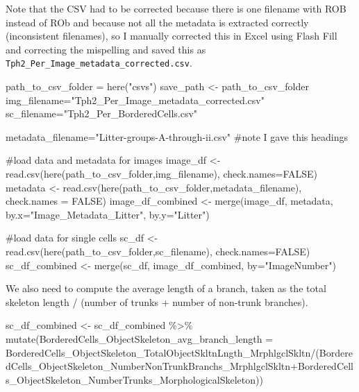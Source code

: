 \documentclass[
  12pt,
  letterpaper,
  DIV=11,
  numbers=noendperiod]{scrartcl}
\newenvironment{Shaded}{\begin{snugshade}}{\end{snugshade}}
\newcommand{\AttributeTok}[1]{\textcolor[rgb]{0.40,0.45,0.13}{#1}}
\newcommand{\CommentTok}[1]{\textcolor[rgb]{0.37,0.37,0.37}{#1}}
\newcommand{\ConstantTok}[1]{\textcolor[rgb]{0.56,0.35,0.01}{#1}}
\newcommand{\FunctionTok}[1]{\textcolor[rgb]{0.28,0.35,0.67}{#1}}
\newcommand{\NormalTok}[1]{\textcolor[rgb]{0.00,0.23,0.31}{#1}}
\newcommand{\OtherTok}[1]{\textcolor[rgb]{0.00,0.23,0.31}{#1}}
\newcommand{\SpecialCharTok}[1]{\textcolor[rgb]{0.37,0.37,0.37}{#1}}
\newcommand{\StringTok}[1]{\textcolor[rgb]{0.13,0.47,0.30}{#1}}
\begin{document}
Note that the CSV had to be corrected because there is one filename with
ROB instead of ROb and because not all the metadata is extracted
correctly (inconsistent filenames), so I manually corrected this in
Excel using Flash Fill and correcting the mispelling and saved this as
\texttt{Tph2\_Per\_Image\_metadata\_corrected.csv}.

\begin{Shaded}
\begin{Highlighting}[]
\NormalTok{path\_to\_csv\_folder }\OtherTok{=} \FunctionTok{here}\NormalTok{(}\StringTok{"csvs"}\NormalTok{)}
\NormalTok{save\_path }\OtherTok{\textless{}{-}}\NormalTok{ path\_to\_csv\_folder}
\NormalTok{img\_filename}\OtherTok{=}\StringTok{"Tph2\_Per\_Image\_metadata\_corrected.csv"}
\NormalTok{sc\_filename}\OtherTok{=}\StringTok{"Tph2\_Per\_BorderedCells.csv"}

\NormalTok{metadata\_filename}\OtherTok{=}\StringTok{"Litter{-}groups{-}A{-}through{-}ii.csv"} \CommentTok{\#note I gave this headings}

\CommentTok{\#load data and metadata for images}
\NormalTok{image\_df }\OtherTok{\textless{}{-}} \FunctionTok{read.csv}\NormalTok{(}\FunctionTok{here}\NormalTok{(path\_to\_csv\_folder,img\_filename), }\AttributeTok{check.names=}\ConstantTok{FALSE}\NormalTok{)}
\NormalTok{metadata }\OtherTok{\textless{}{-}} \FunctionTok{read.csv}\NormalTok{(}\FunctionTok{here}\NormalTok{(path\_to\_csv\_folder,metadata\_filename), }\AttributeTok{check.names =} \ConstantTok{FALSE}\NormalTok{)}
\NormalTok{image\_df\_combined }\OtherTok{\textless{}{-}} \FunctionTok{merge}\NormalTok{(image\_df, metadata, }\AttributeTok{by.x=}\StringTok{"Image\_Metadata\_Litter"}\NormalTok{, }\AttributeTok{by.y=}\StringTok{"Litter"}\NormalTok{)}

\CommentTok{\#load data for single cells}
\NormalTok{sc\_df }\OtherTok{\textless{}{-}} \FunctionTok{read.csv}\NormalTok{(}\FunctionTok{here}\NormalTok{(path\_to\_csv\_folder,sc\_filename), }\AttributeTok{check.names=}\ConstantTok{FALSE}\NormalTok{)}
\NormalTok{sc\_df\_combined }\OtherTok{\textless{}{-}} \FunctionTok{merge}\NormalTok{(sc\_df, image\_df\_combined, }\AttributeTok{by=}\StringTok{"ImageNumber"}\NormalTok{)}
\end{Highlighting}
\end{Shaded}

We also need to compute the average length of a branch, taken as the
total skeleton length / (number of trunks + number of non-trunk
branches).

\begin{Shaded}
\begin{Highlighting}[]
\NormalTok{sc\_df\_combined }\OtherTok{\textless{}{-}}\NormalTok{ sc\_df\_combined }\SpecialCharTok{\%\textgreater{}\%} 
  \FunctionTok{mutate}\NormalTok{(}\AttributeTok{BorderedCells\_ObjectSkeleton\_avg\_branch\_length =}\NormalTok{ BorderedCells\_ObjectSkeleton\_TotalObjectSkltnLngth\_MrphlgclSkltn}\SpecialCharTok{/}\NormalTok{(BorderedCells\_ObjectSkeleton\_NumberNonTrunkBranchs\_MrphlgclSkltn}\SpecialCharTok{+}\NormalTok{BorderedCells\_ObjectSkeleton\_NumberTrunks\_MorphologicalSkeleton))}
\end{Highlighting}
\end{Shaded}
\end{document}
